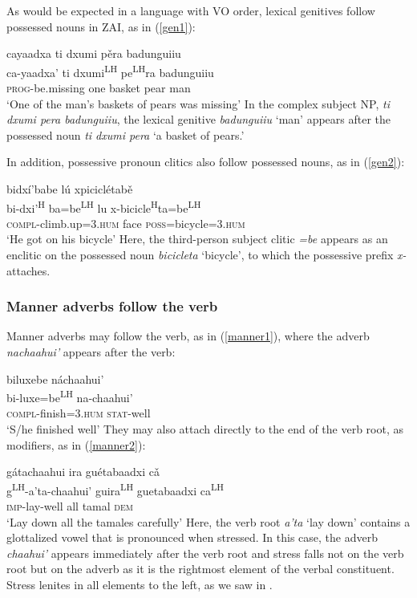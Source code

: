 As would be expected in a language with VO order, lexical genitives follow possessed nouns in ZAI, as in (\ref{gen1}): 

\ea\label{gen1}
\glll cayaadxa ti dxumi p\v{e}ra badunguiiu \\
ca-yaadxa' ti dxumi\textsuperscript{LH} pe\textsuperscript{LH}ra badunguiiu \\
\textsc{prog}-be.missing one basket pear man \\
\glt `One of the man's baskets of pears was missing'
\z
In the complex subject NP, \textit{ti dxumi pera badunguiiu}, the lexical genitive \textit{badunguiiu} `man' appears after the possessed noun \textit{ti dxumi pera} `a basket of pears.'

In addition, possessive pronoun clitics also follow possessed nouns, as in (\ref{gen2}):

\ea\label{gen2}
\glll bidx\'{i}'babe l\'{u} xpicicl\'{e}tab\v{e} \\
bi-dxi'\textsuperscript{H} ba=be\textsuperscript{LH} lu x-bicicle\textsuperscript{H}ta=be\textsuperscript{LH} \\
\textsc{compl}-climb.up=\textsc{3.hum} face \textsc{poss}=bicycle=\textsc{3.hum} \\
\glt `He got on his bicycle'
\z
Here, the third-person subject clitic \textit{=be} appears as an enclitic on the possessed noun \textit{bicicleta} `bicycle', to which the possessive prefix \textit{x-} attaches.



\subsubsection{Manner adverbs follow the verb}

Manner adverbs may follow the verb, as in (\ref{manner1}), where the adverb \textit{nachaahui'} appears after the verb: 

\ea\label{manner1}
\glll biluxebe n\'{a}chaahui' \\
bi-luxe=be\textsuperscript{LH} na-chaahui' \\
\textsc{compl}-finish=\textsc{3.hum} \textsc{stat}-well \\
\glt `S/he finished well'
\z
They may also attach directly to the end of the verb root, as modifiers, as in (\ref{manner2}):

\ea\label{manner2}
\glll g\'{a}tachaahui ira gu\'{e}tabaadxi c\v{a} \\
g\textsuperscript{LH}-a'ta-chaahui' guira\textsuperscript{LH} guetabaadxi ca\textsuperscript{LH} \\
\textsc{imp}-lay-well all tamal \textsc{dem} \\
\glt `Lay down all the tamales carefully'
\z
Here, the verb root \textit{a'ta} `lay down' contains a glottalized vowel that is pronounced when stressed. In this case, the adverb \textit{chaahui'} appears immediately after the verb root and stress falls not on the verb root but on the adverb as it is the rightmost element of the verbal constituent. Stress lenites in all elements to the left, as we saw in . 

